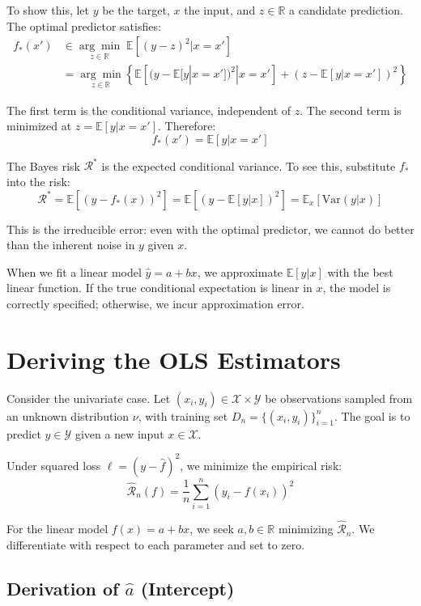 \documentclass[main.tex]{subfiles}
\begin{document}
To show this, let $y$ be the target, $x$ the input, and $z \in \mathbb{R}$ a candidate prediction. The optimal predictor satisfies:
\begin{align}
f_*(x') &\in \underset{z \in \mathbb{R}}{\arg\min} \; \mathbb{E}\left[(y - z)^2 | x = x'\right] \\[8pt]
&= \underset{z \in \mathbb{R}}{\arg\min} \left\{ \mathbb{E}\left[(y - \mathbb{E}[y|x=x'])^2 | x = x'\right] + (z - \mathbb{E}[y|x=x'])^2 \right\}
\end{align}

The first term is the conditional variance, independent of $z$. The second term is minimized at $z = \mathbb{E}[y|x=x']$. Therefore:
$$f_*(x') = \mathbb{E}[y | x = x']$$

The Bayes risk $\mathcal{R}^*$ is the expected conditional variance. To see this, substitute $f_*$ into the risk:
$$\mathcal{R}^* = \mathbb{E}[(y - f_*(x))^2] = \mathbb{E}[(y - \mathbb{E}[y|x])^2] = \mathbb{E}_x\left[\text{Var}(y|x)\right]$$

This is the irreducible error: even with the optimal predictor, we cannot do better than the inherent noise in $y$ given $x$.

When we fit a linear model $\hat{y} = a + bx$, we approximate $\mathbb{E}[y|x]$ with the best linear function. If the true conditional expectation is linear in $x$, the model is correctly specified; otherwise, we incur approximation error.

\needspace{0.33\textheight}
\section{Deriving the OLS Estimators}

Consider the univariate case. Let $(x_i, y_i) \in \mathcal{X} \times \mathcal{Y}$ be observations sampled from an unknown distribution $\nu$, with training set $D_n = \{(x_i, y_i)\}_{i=1}^{n}$. The goal is to predict $y \in \mathcal{Y}$ given a new input $x \in \mathcal{X}$.

Under squared loss $\ell = (y - \hat{f})^2$, we minimize the empirical risk:
$$\hat{\mathcal{R}}_n(f) = \frac{1}{n} \sum_{i=1}^{n} (y_i - f(x_i))^2$$

For the linear model $f(x) = a + bx$, we seek $a, b \in \mathbb{R}$ minimizing $\hat{\mathcal{R}}_n$. We differentiate with respect to each parameter and set to zero.

\subsection{Derivation of $\hat{a}$ (Intercept)}
\end{document}
